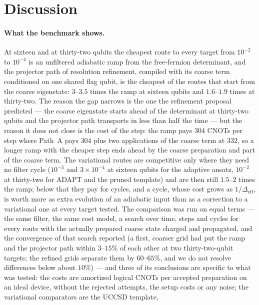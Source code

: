 \documentclass[a4paper,11pt,noarxiv]{quantumarticle}
\newcommand{\Deff}{\Delta_{\mathrm{eff}}}
\begin{document}
\section{Discussion}
\label{sec:discussion}
\paragraph{What the benchmark shows.}
At sixteen and at thirty-two qubits the cheapest route to every target
from $10^{-2}$ to $10^{-4}$ is an unfiltered adiabatic ramp from the
free-fermion determinant, and the projector path of resolution refinement,
compiled with its coarse term conditioned on one shared flag qubit, is the
cheapest of the routes that start from the coarse eigenstate: $3$--$3.5$
times the ramp at sixteen qubits and $1.6$--$1.9$ times at thirty-two.
The reason the gap narrows is the one the refinement proposal predicted
--- the coarse eigenstate starts ahead of the determinant at thirty-two
qubits and the projector path transports in less than half the time ---
but the reason it does not close is the cost of the step: the ramp pays
$304$ CNOTs per step where Path~A pays $304$ plus two applications of the
coarse term at $332$, so a longer ramp with the cheaper step ends ahead by
the coarse preparation and part of the coarse term.  The variational
routes are competitive only where they need no filter cycle ($10^{-3}$
and $3\times10^{-4}$ at sixteen qubits for the adaptive ansatz, $10^{-2}$
at thirty-two for ADAPT and the pruned template) and are then still
$1.5$--$2$ times the ramp; below that they pay for cycles, and a cycle,
whose cost grows as $1/\Deff$, is worth more as extra evolution of an
adiabatic input than as a correction to a variational one at every target
tested.  The comparison was run on equal terms --- the same filter, the
same cost model, a search over time, steps and cycles for every route
with the actually prepared coarse state charged and propagated, and the
convergence of that search reported (a first, coarser grid had put the
ramp and the projector path within $3$--$15\%$ of each other at two
thirty-two-qubit targets; the refined grids separate them by
$60$--$65\%$, and we do not resolve differences below about $10\%$) ---
and three of its conclusions are specific to what was tested: the costs are amortized logical CNOTs per accepted
preparation on an ideal device, without the rejected attempts, the setup
costs or any noise; the variational comparators are the UCCSD template,
\end{document}
